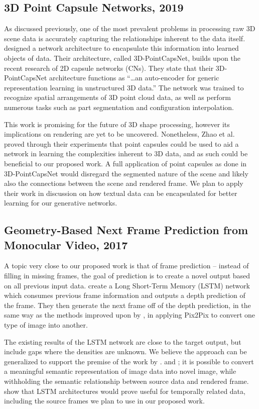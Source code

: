 \documentclass{article}
\begin{document}
\subsection*{3D Point Capsule Networks, 2019}
\nocite{3D_capsule_networks}
As discussed previously, one of the most prevalent problems in processing raw 3D
scene data is accurately capturing the relationships inherent to the data itself.
\cite{3D_capsule_networks} designed a network architecture to
encapsulate this information into
learned objects of data. Their architecture, called 3D-PointCapsNet,
builds upon the recent research of 2D capsule networks (CNs).
They state that their 3D-PointCapsNet architecture functions as
``\dots an auto-encoder for generic representation
learning in unstructured 3D data.''
The network was trained
to recognize spatial arrangements of 3D point cloud data, as well as perform
numerous tasks such as part segmentation and configuration interpolation.

This work is promising for the future of 3D shape processing, however its
implications on rendering are yet to be uncovered. Nonetheless, Zhao et al.
proved through their experiments that point capsules could be used to
aid a network in learning the complexities inherent to 3D data, and as such
could be beneficial to our proposed work. A full application of point capsules
as done in 3D-PointCapsNet would disregard the segmented nature of the scene and
likely also the connections between the scene and rendered frame.
We plan to apply their work in discussion on how textual data can be encapsulated
for better learning for our generative networks.

\subsection*{Geometry-Based Next Frame Prediction from Monocular Video, 2017}
\nocite{frame_prediction}
A topic very close to our proposed work is that of frame prediction --
instead of filling in missing frames, the goal of prediction is to create a novel
output based on all previous input data.
\cite{frame_prediction} create a Long Short-Term Memory (LSTM) network
which consumes previous frame information and outputs a depth prediction of the
frame. They then generate the next frame off of the depth prediction, in the same
way as the methods improved upon by \cite{image_to_image},
in applying Pix2Pix to convert one type of image into another.

The existing results of the LSTM network are close to the
target output, but include gaps where the densities are unknown.
We believe the approach can be generalized to support the premise of
the work by \cite{path_tracing}. and \cite{image_to_image};
it is possible to convert a meaningful semantic representation
of image data into novel image, while withholding the semantic relationship
between source data and rendered frame. \cite{frame_prediction} show that
LSTM architectures would prove useful for temporally related data,
including the source frames we plan to use in our proposed work.
\end{document}
